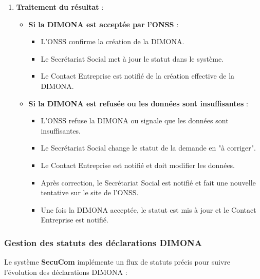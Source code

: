 \begin{enumerate}
  \newpage
  \item \textbf{Traitement du résultat} :
    \begin{itemize}
      \item \textbf{Si la DIMONA est acceptée par l'ONSS} :
        \begin{itemize}
          \item L'ONSS confirme la création de la DIMONA.
          \item Le Secrétariat Social met à jour le statut dans le système.
          \item Le Contact Entreprise est notifié de la création effective de la DIMONA.
        \end{itemize}
      \item \textbf{Si la DIMONA est refusée ou les données sont insuffisantes} :
        \begin{itemize}
          \item L'ONSS refuse la DIMONA ou signale que les données sont insuffisantes.
          \item Le Secrétariat Social change le statut de la demande en "à corriger".
          \item Le Contact Entreprise est notifié et doit modifier les données.
          \item Après correction, le Secrétariat Social est notifié et fait une nouvelle tentative sur le site de l'ONSS.
          \item Une fois la DIMONA acceptée, le statut est mis à jour et le Contact Entreprise est notifié.
        \end{itemize}
    \end{itemize}
\end{enumerate}

\subsubsection{Gestion des statuts des déclarations DIMONA}

\noindent Le système \textbf{SecuCom} implémente un flux de statuts précis pour suivre l'évolution des déclarations DIMONA :

